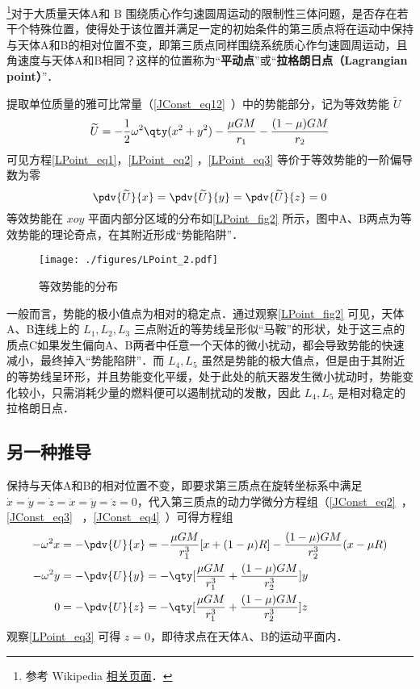 

\footnote{参考 Wikipedia \href{https://en.wikipedia.org/wiki/Lagrange_point}{相关页面}．}对于大质量天体A和 B 围绕质心作匀速圆周运动的限制性三体问题，是否存在若干个特殊位置，使得处于该位置并满足一定的初始条件的第三质点将在运动中保持与天体A和B的相对位置不变，即第三质点同样围绕系统质心作匀速圆周运动，且角速度与天体A和B相同？这样的位置称为“\textbf{平动点}”或“\textbf{拉格朗日点（Lagrangian point）}”．

提取单位质量的雅可比常量（\autoref{JConst_eq12}~）中的势能部分，记为等效势能 $\widetilde{U}$ 
\begin{equation}%
\widetilde{U}=-\frac{1}{2}\omega^2\qty(x^2+y^2)-\frac{\mu GM}{r_1}-\frac{(1-\mu) GM}{r_2}
\end{equation}
可见方程\autoref{LPoint_eq1}，\autoref{LPoint_eq2} ，\autoref{LPoint_eq3} 等价于等效势能的一阶偏导数为零
 \begin{equation}%
\pdv{\widetilde{U}}{x}=\pdv{\widetilde{U}}{y}=\pdv{\widetilde{U}}{z}=0
\end{equation}
等效势能在 $xoy$ 平面内部分区域的分布如\autoref{LPoint_fig2} 所示，图中A、B两点为等效势能的理论奇点，在其附近形成“势能陷阱”． 
\begin{figure}[ht]
\centering
\texttt{[image: ./figures/LPoint\_2.pdf]}
\caption{等效势能的分布} \label{LPoint_fig2}
\end{figure}

一般而言，势能的极小值点为相对的稳定点．通过观察\autoref{LPoint_fig2} 可见，天体A、B连线上的 $L_1,L_2,L_3$ 三点附近的等势线呈形似“马鞍”的形状，处于这三点的质点C如果发生偏向A、B两者中任意一个天体的微小扰动，都会导致势能的快速减小，最终掉入“势能陷阱”．而 $L_4,L_5$ 虽然是势能的极大值点，但是由于其附近的等势线呈环形，并且势能变化平缓，处于此处的航天器发生微小扰动时，势能变化较小，只需消耗少量的燃料便可以遏制扰动的发散，因此 $L_4,L_5$ 是相对稳定的拉格朗日点．  

\subsection{另一种推导}

保持与天体A和B的相对位置不变，即要求第三质点在旋转坐标系中满足 $\dot{x}=\dot{y}=\dot{z}=\ddot{x}=\ddot{y}=\ddot{z}=0$，代入第三质点的动力学微分方程组（\autoref{JConst_eq2}~，\autoref{JConst_eq3}~ ，\autoref{JConst_eq4}~）可得方程组
\begin{align}
-\omega^2 x &=- \pdv{U}{x}=-\frac{\mu GM}{r_1^3}[x+(1-\mu)R]-\frac{(1-\mu)GM}{r_2^3}(x-\mu R)\label{LPoint_eq1}\\
-\omega^2 y &=- \pdv{U}{y}=-\qty[\frac{\mu GM}{r_1^3}+\frac{(1-\mu)GM}{r_2^3}]y\label{LPoint_eq2}\\
0 &=- \pdv{U}{z} =-\qty[\frac{\mu GM}{r_1^3}+\frac{(1-\mu)GM}{r_2^3}]z\label{LPoint_eq3}
\end{align}
观察\autoref{LPoint_eq3} 可得 $z=0$，即待求点在天体A、B的运动平面内．

